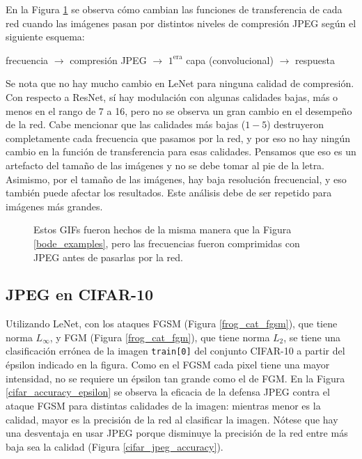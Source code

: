 En la Figura \ref{bode_gifs} se observa cómo cambian las funciones de transferencia de cada red cuando las imágenes pasan por distintos niveles de compresión JPEG según el siguiente esquema:
\begin{center}
    frecuencia $\to$ compresión JPEG $\to$ $1^\text{era}$ capa (convolucional) $\to$ respuesta
\end{center}
Se nota que no hay mucho cambio en LeNet para ninguna calidad de compresión. Con respecto a ResNet, sí hay modulación con algunas calidades bajas, más o menos en el rango de 7 a 16, pero no se observa un gran cambio en el desempeño de la red. Cabe mencionar que las calidades más bajas ($1-5$) destruyeron completamente cada frecuencia que pasamos por la red, y por eso no hay ningún cambio en la función de transferencia para esas calidades. Pensamos que eso es un artefacto del tamaño de las imágenes y no se debe tomar al pie de la letra. Asimismo, por el tamaño de las imágenes, hay baja resolución frecuencial, y eso también puede afectar los resultados. Este análisis debe de ser repetido para imágenes más grandes.
\begin{figure}[h]
    \caption{Estos GIFs fueron hechos de la misma manera que la Figura \ref{bode_examples}, pero las frecuencias fueron comprimidas con JPEG antes de pasarlas por la red.}
    \label{bode_gifs}
\end{figure}



\subsection{JPEG en CIFAR-10}

Utilizando LeNet, con los ataques FGSM (Figura \ref{frog_cat_fgsm}), que tiene norma $L_\infty$, y FGM (Figura \ref{frog_cat_fgm}), que tiene norma $L_2$, se tiene una clasificación errónea de la imagen \texttt{train[0]} del conjunto CIFAR-10 a partir del épsilon indicado en la figura. Como en el FGSM cada pixel tiene una mayor intensidad, no se requiere un épsilon tan grande como el de FGM. En la Figura \ref{cifar_accuracy_epsilon} se observa la eficacia de la defensa JPEG contra el ataque FGSM para distintas calidades de la imagen: mientras menor es la calidad, mayor es la precisión de la red al clasificar la imagen. Nótese que hay una desventaja en usar JPEG porque disminuye la precisión de la red entre más baja sea la calidad (Figura \ref{cifar_jpeg_accuracy}).

